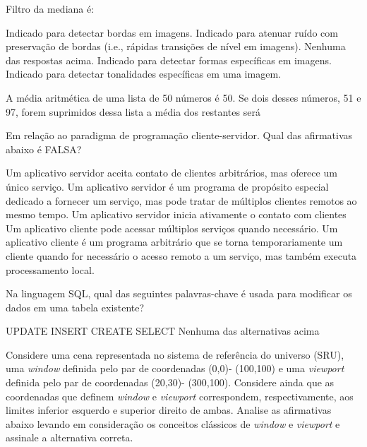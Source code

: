 \documentclass[12pt, addpoints]{exam}
\begin{document}
    \begin{questions}

    \newpage
    \question
Filtro da mediana é:
\begin{choices}
\choice Indicado para detectar bordas em imagens.
\choice Indicado para atenuar ruído com preservação de bordas (i.e., rápidas transições de nível em imagens).
\choice Nenhuma das respostas acima.
\choice Indicado para detectar formas específicas em imagens.
\choice Indicado para detectar tonalidades específicas em uma imagem.
\end{choices}

\question
A média aritmética de uma lista de 50 números é 50. Se dois desses números, 51 e 97, forem suprimidos dessa lista a média dos restantes será

\begin{choices}
\end{choices}

\question
Em relação ao paradigma de programação cliente-servidor. Qual das afirmativas abaixo é FALSA?
\begin{choices}
\choice Um aplicativo servidor aceita contato de clientes arbitrários, mas oferece um único serviço. 
\choice Um aplicativo servidor é um programa de propósito especial dedicado a fornecer um serviço, mas pode tratar de múltiplos clientes remotos ao mesmo tempo. 
\choice Um aplicativo servidor inicia ativamente o contato com clientes 
\choice Um aplicativo cliente pode acessar múltiplos serviços quando necessário.
\choice Um aplicativo cliente é um programa arbitrário que se torna temporariamente um cliente quando for necessário o acesso remoto a um serviço, mas também executa processamento local.
\end{choices}

\question
Na linguagem SQL, qual das seguintes palavras-chave é usada para modificar os
dados em uma tabela existente?

\begin{choices}
\choice UPDATE
\choice INSERT
\choice CREATE
\choice SELECT
\choice Nenhuma das alternativas acima
\end{choices}

\question
Considere uma cena representada no sistema de referência do universo (SRU), uma \textit{window} definida pelo par de coordenadas (0,0)- (100,100) e uma \textit{viewport} definida pelo par de coordenadas (20,30)- (300,100). Considere ainda que as coordenadas que definem \textit{window} e \textit{viewport} correspondem, respectivamente, aos limites inferior esquerdo e superior direito de ambas. Analise as afirmativas abaixo levando em consideração os conceitos clássicos de \textit{window} e \textit{viewport} e assinale a alternativa correta.


\end{questions}
\end{document}
